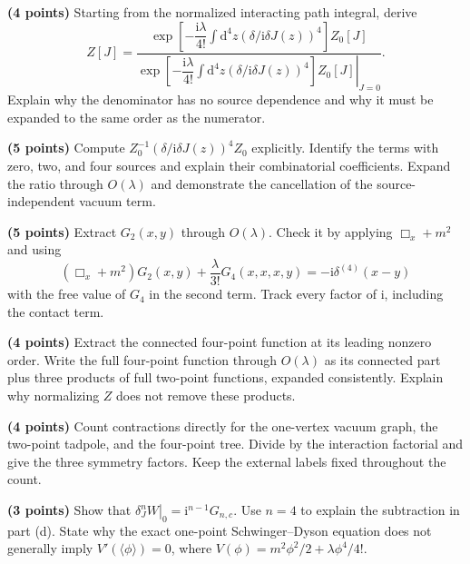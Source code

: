 \documentclass[11pt]{article}
\newcommand{\dd}{\mathrm d}
\newcommand{\ii}{\mathrm i}
\begin{document}
\begin{parts}
\item \textbf{(4 points)} Starting from the normalized interacting
path integral, derive
\[
 Z[J]=\frac{\exp\!\left[-\dfrac{\ii\lambda}{4!}\int\dd^4z
 (\delta/\ii\delta J(z))^4\right]Z_0[J]}
 {\left.\exp\!\left[-\dfrac{\ii\lambda}{4!}\int\dd^4z
 (\delta/\ii\delta J(z))^4\right]Z_0[J]\right|_{J=0}}.
\]
Explain why the denominator has no source dependence and why it must
be expanded to the same order as the numerator.

\item \textbf{(5 points)} Compute
\(Z_0^{-1}(\delta/\ii\delta J(z))^4Z_0\) explicitly. Identify the
terms with zero, two, and four sources and explain their combinatorial
coefficients. Expand the ratio through \(O(\lambda)\) and demonstrate
the cancellation of the source-independent vacuum term.

\item \textbf{(5 points)} Extract \(G_2(x,y)\) through
\(O(\lambda)\). Check it by applying \(\Box_x+m^2\) and using
\[
 (\Box_x+m^2)G_2(x,y)+\frac{\lambda}{3!}G_4(x,x,x,y)
 =-\ii\delta^{(4)}(x-y)
\]
with the free value of \(G_4\) in the second term. Track every factor
of \(\ii\), including the contact term.

\item \textbf{(4 points)} Extract the connected four-point function
at its leading nonzero order. Write the full four-point function
through \(O(\lambda)\) as its connected part plus three products of
full two-point functions, expanded consistently. Explain why
normalizing \(Z\) does not remove these products.

\item \textbf{(4 points)} Count contractions directly for the
one-vertex vacuum graph, the two-point tadpole, and the four-point
tree. Divide by the interaction factorial and give the three symmetry
factors. Keep the external labels fixed throughout the count.

\item \textbf{(3 points)} Show that
\(\left.\delta_J^nW\right|_0=\ii^{n-1}G_{n,c}\).
Use \(n=4\) to explain the subtraction in part (d). State why the
exact one-point Schwinger--Dyson equation does not generally imply
\(V'(\langle\phi\rangle)=0\), where
\(V(\phi)=m^2\phi^2/2+\lambda\phi^4/4!\).
\end{parts}
\end{document}
